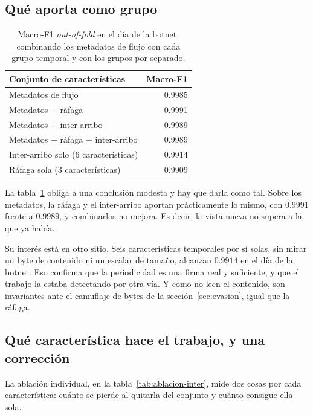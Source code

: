 \subsection*{Qué aporta como grupo}

\begin{table}[htbp]
  \centering
  \caption[Aportación de cada grupo de características]{Macro-F1
  \emph{out-of-fold} en el día de la botnet, combinando los metadatos de flujo
  con cada grupo temporal y con los grupos por separado.}
  \label{tab:ablacion-grupos}
  \begin{tabular}{lr}
    \toprule
    \textbf{Conjunto de características} & \textbf{Macro-F1} \\
    \midrule
    Metadatos de flujo                   & 0.9985 \\
    Metadatos + ráfaga                   & 0.9991 \\
    Metadatos + inter-arribo             & 0.9989 \\
    Metadatos + ráfaga + inter-arribo    & 0.9989 \\
    \midrule
    Inter-arribo solo (6 características) & 0.9914 \\
    Ráfaga sola (3 características)       & 0.9909 \\
    \bottomrule
  \end{tabular}
\end{table}

La tabla~\ref{tab:ablacion-grupos} obliga a una conclusión modesta y hay que
darla como tal. Sobre los metadatos, la ráfaga y el inter-arribo aportan
prácticamente lo mismo, con $0.9991$ frente a $0.9989$, y combinarlos no
mejora. Es decir, la vista nueva no supera a la que ya había.

Su interés está en otro sitio. Seis características temporales por sí solas, sin
mirar un byte de contenido ni un escalar de tamaño, alcanzan $0.9914$ en el día
de la botnet. Eso confirma que la periodicidad es una firma real y suficiente, y
que el trabajo la estaba detectando por otra vía. Y como no leen el contenido,
son invariantes ante el camuflaje de bytes de la sección~\ref{sec:evasion}, igual
que la ráfaga.

\subsection*{Qué característica hace el trabajo, y una corrección}

La ablación individual, en la tabla~\ref{tab:ablacion-inter}, mide dos cosas por
cada característica: cuánto se pierde al quitarla del conjunto y cuánto consigue
ella sola.

